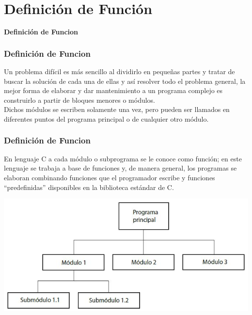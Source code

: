 \section*{Definición de Función}

\begin{frame}[c] 
\centering
\huge \textbf{Definición de Funcion}
\end{frame}



\begin{frame}
    \frametitle{Definición de Funcion}
    \justify
    \hspace{5mm}Un problema difícil es más sencillo al dividirlo en pequeñas partes y tratar de buscar la solución de cada una de ellas y así resolver todo el problema general, la mejor forma de elaborar
    y dar mantenimiento a un programa complejo es construirlo a partir de bloques menores o módulos.\\
    \hspace{5mm}Dichos módulos se escriben solamente una vez, pero pueden ser llamados en diferentes puntos del programa principal o de cualquier otro módulo.
\end{frame}


\begin{frame}
\frametitle{Definición de Funcion}
\justify
\hspace{5mm}En lenguaje C a cada módulo o subprograma se le conoce como función; en este lenguaje se trabaja a base de funciones y, de manera general, los programas se elaboran combinando funciones que el programador escribe y funciones “predefinidas” disponibles en la biblioteca estándar de C.
\begin{center}
    \includegraphics[scale=0.4]{figs/diagramaProgramacionModular.jpg}
\end{center}
\end{frame}



